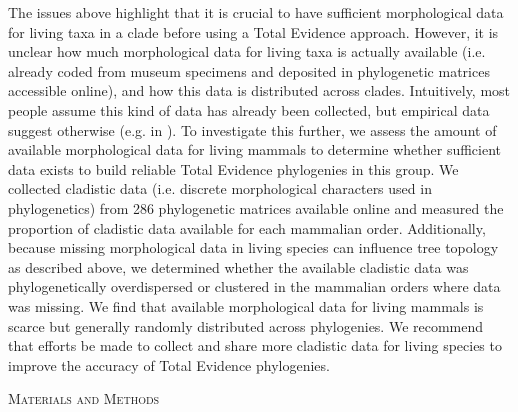 \documentclass[12pt,letterpaper]{article}
\renewcommand{\section}[1]{%
\bigskip
\begin{center}
\begin{Large}
\normalfont\scshape #1
\medskip
\end{Large}
\end{center}}
\begin{document}
The issues above highlight that it is crucial to have sufficient morphological data for living taxa in a clade before using a Total Evidence approach.
However, it is unclear how much morphological data for living taxa is actually available (i.e. already coded from museum specimens and deposited in phylogenetic matrices accessible online), and how this data is distributed across clades.
Intuitively, most people assume this kind of data has already been collected, but empirical data suggest otherwise (e.g. in \cite{ronquista2012,slaterphylogenetic2013,beckancient2014}).
To investigate this further, we assess the amount of available morphological data for living mammals to determine whether sufficient data exists to build reliable Total Evidence phylogenies in this group.
We collected cladistic data (i.e. discrete morphological characters used in phylogenetics) from 286 phylogenetic matrices available online and measured the proportion of cladistic data available for each mammalian order.
Additionally, because missing morphological data in living species can influence tree topology as described above, %
we determined whether the available cladistic data was phylogenetically overdispersed or clustered in the mammalian orders where data was missing. 
We find that available morphological data for living mammals is scarce but generally randomly distributed across phylogenies. 
We recommend that efforts be made to collect and share more cladistic data for living species to improve the accuracy of Total Evidence phylogenies.

%
%
\section{Materials and Methods}
\end{document}
